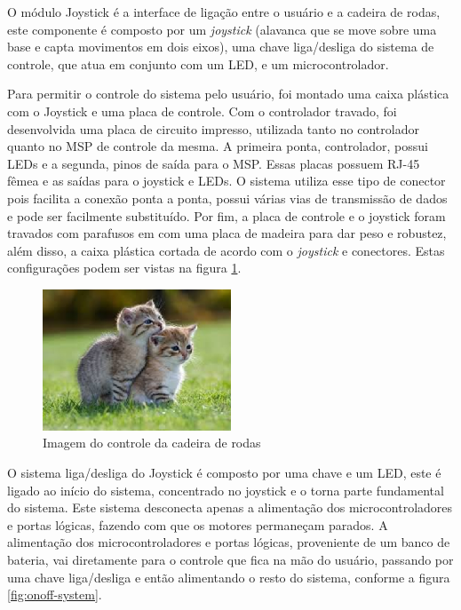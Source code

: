 		O módulo Joystick é a interface de ligação entre o usuário e a cadeira de rodas, este componente é composto por um \textit{joystick} (alavanca que se move sobre uma base e capta movimentos em dois eixos), uma chave liga/desliga do sistema de controle, que atua em conjunto com um LED, e um microcontrolador.

		Para permitir o controle do sistema pelo usuário, foi montado uma caixa plástica com o Joystick e uma placa de controle. Com o controlador travado, foi desenvolvida uma placa de circuito impresso, utilizada tanto no controlador quanto no MSP de controle da mesma. A primeira ponta, controlador, possui LEDs e a segunda, pinos de saída para o MSP. Essas placas possuem RJ-45 fêmea e as saídas para o joystick e LEDs. O sistema utiliza esse tipo de conector pois facilita a conexão ponta a ponta, possui várias vias de transmissão de dados e pode ser facilmente substituído. Por fim, a placa de controle e o joystick foram travados com parafusos em com uma placa de madeira para dar peso e robustez, além disso, a caixa plástica cortada de acordo com o \textit{joystick} e conectores. Estas configurações podem ser vistas na figura \ref{fig:joy_hand_control}.

		\begin{figure}[!htb]
			\centering
			\includegraphics[width = 0.5\textwidth]{figuras/resultados/joy_hand_control}
			\caption{Imagem do controle da cadeira de rodas}
			\label{fig:joy_hand_control}
		\end{figure}

		O sistema liga/desliga do Joystick é composto por uma chave e um LED, este é ligado ao início do sistema, concentrado no joystick e o torna parte fundamental do sistema. Este sistema desconecta apenas a alimentação dos microcontroladores e portas lógicas, fazendo com que os motores permaneçam parados. A alimentação dos microcontroladores e portas lógicas, proveniente de um banco de bateria, vai diretamente para o controle que fica na mão do usuário, passando por uma chave liga/desliga e então alimentando o resto do sistema, conforme a figura \ref{fig:onoff-system}. 
		
